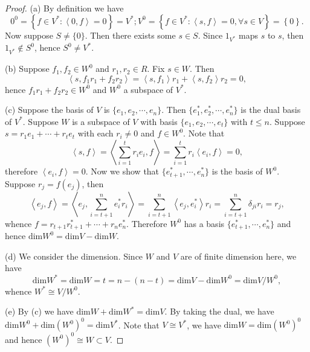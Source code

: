 \begin{proof}
(a) By definition we have 
$$
0^0=\left\{ f\in V^*:\left< 0,f \right> =0 \right\} =V^*;V^0=\left\{ f\in V^*:\left< s,f \right> =0,\forall s\in V \right\} =\left\{ 0 \right\} .
$$
Now suppose $S\ne\{0\}$. Then there exists some $s\in S$. Since $1_{V^*}$ maps $s$ to $s$, then $1_{V^*}\notin S^0$, hence $S^0\ne V^*$.\par
(b) Suppose $f_1,f_2\in W^0$ and $r_1,r_2\in R$. Fix $s\in W$. Then 
$$
\left< s,f_1r_1+f_2r_2 \right> =\left< s,f_1 \right> r_1+\left< s,f_2 \right> r_2=0,
$$
hence $f_1r_1+f_2r_2\in W^0$ and $W^0$ a subspace of $V^*$.\par
(c) Suppose the basis of $V$ is $\{e_1,e_2,\cdots,e_n\}$. Then $\{e_1^*,e_2^*,\cdots,e_n^*\}$ is the dual basis of $V^*$. Suppose $W$ is a subspace of $V$ with basis $\{e_1,e_2,\cdots,e_t\}$ with $t\le n$. Suppose $s=r_1e_1+\cdots+r_te_t$ with each $r_i\ne 0$ and $f\in W^0$. Note that 
$$
\left< s,f \right> =\left< \sum_{i=1}^t{r_ie_i,f} \right> =\sum_{i=1}^t{r_i\left< e_i,f \right>}=0,
$$
therefore $\left<e_i,f\right>=0$. Now we show that $\{e_{t+1}^*,\cdots,e_n^*\}$ is the basis of $W^0$. Suppose $r_j=f(e_j)$, then 
$$
\left< e_j,f \right> =\left< e_j,\sum_{i=t+1}^n{e_{i}^{*}r_i} \right> =\sum_{i=t+1}^n{\left< e_j,e_{i}^{*} \right> r_i}=\sum_{i=t+1}^n{\delta _{ji}r_i}=r_j,
$$
whence $f=r_{t+1}r_{t+1}^*+\cdots+r_ne_n^*$. Therefore $W^0$ has a basis $\{e_{t+1}^*,\cdots,e_n^*\}$ and hence $\mathrm{dim}W^0=\mathrm{dim}V-\mathrm{dim}W$.\par
(d) We consider the dimension. Since $W$ and $V$ are of finite dimension here, we have 
$$
\mathrm{dim}W^*=\mathrm{dim}W=t=n-\left( n-t \right) =\mathrm{dim}V-\mathrm{dim}W^0=\mathrm{dim}V/W^0,
$$
whence $W^*\cong V/W^0$.\par
(e) By (c) we have $\mathrm{dim}W+\mathrm{dim}W^*=\mathrm{dim}V$. By taking the dual, we have $\mathrm{dim}W^0+\mathrm{dim}(W^0)^0=\mathrm{dim}V^*$. Note that $V\cong V^*$, we have $\mathrm{dim}W=\mathrm{dim}(W^0)^0$ and hence $(W^0)^0\cong W\subset V$.
\end{proof}
